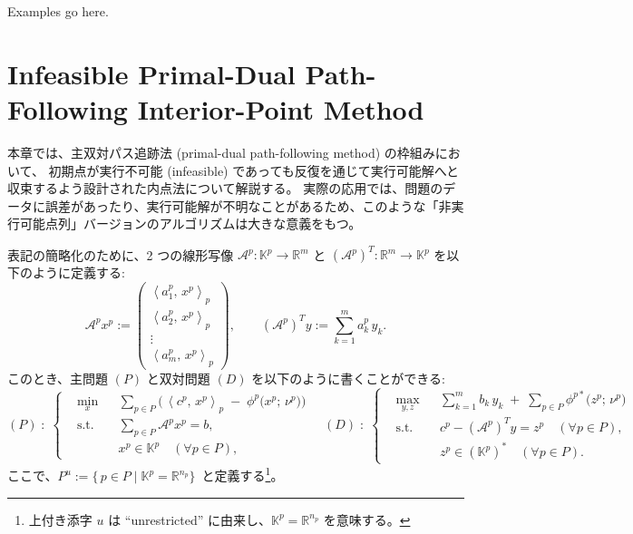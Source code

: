 \documentclass{jsarticle}
\newcommand{\inprod}[2]{\left\langle #1, \, #2 \right\rangle}
\begin{document}
Examples go here.

\section{Infeasible Primal-Dual Path-Following Interior-Point Method}
\label{sec:infeasible_IPM}

本章では、主双対パス追跡法 (primal-dual path-following method) の枠組みにおいて、
初期点が実行不可能 (infeasible) であっても反復を通じて実行可能解へと収束するよう設計された内点法について解説する。
実際の応用では、問題のデータに誤差があったり、実行可能解が不明なことがあるため、このような「非実行可能点列」バージョンのアルゴリズムは大きな意義をもつ。

\medskip

\noindent
表記の簡略化のために、2 つの線形写像
$\mathcal{A}^p : \mathbb{K}^p \to \mathbb{R}^m$ と
$(\mathcal{A}^p)^T : \mathbb{R}^m \to \mathbb{K}^p$
を以下のように定義する:  
\[
  \mathcal{A}^p x^p
  := 
  \begin{pmatrix}
      \inprod{a^p_1}{x^p}_p \\
      \inprod{a^p_2}{x^p}_p \\
      \vdots \\
      \inprod{a^p_m}{x^p}_p
  \end{pmatrix},
  \qquad
  (\mathcal{A}^p)^T y
  :=
  \sum_{k=1}^m a^p_k\,y_k.
\]
このとき、主問題 $(P)$ と双対問題 $(D)$ を以下のように書くことができる:
\[
  (P)\;:\;
  \left\{
  \begin{aligned}
      &\min_{x}
       && \sum_{p \in P} \bigl(\,\inprod{c^p}{x^p}_p \;-\; \phi^p\bigl(x^p;\,\nu^p\bigr)\bigr) \\
      &\text{s.t.}
       && \sum_{p \in P}\mathcal{A}^p x^p = b,\\
      & && x^p \in \mathbb{K}^p \quad (\forall p \in P),
  \end{aligned}
  \right.
  \quad
  (D)\;:\;
  \left\{
  \begin{aligned}
      &\max_{y,z}
       && \sum_{k=1}^m b_k\,y_k 
          \;+\; \sum_{p \in P} \phi^{p*}\bigl(z^p;\,\nu^p\bigr) \\
      &\text{s.t.}
       && c^p - (\mathcal{A}^p)^T y = z^p \quad (\forall p \in P),\\
      & && z^p \in (\mathbb{K}^p)^* \quad (\forall p \in P).
  \end{aligned}
  \right.
\]
ここで、$P^u := \{\,p \in P \mid \mathbb{K}^p = \mathbb{R}^{n_p}\}\,$ と定義する\footnote{%
  上付き添字 $u$ は “unrestricted” に由来し、$\mathbb{K}^p=\mathbb{R}^{n_p}$ を意味する。
}。
\end{document}
